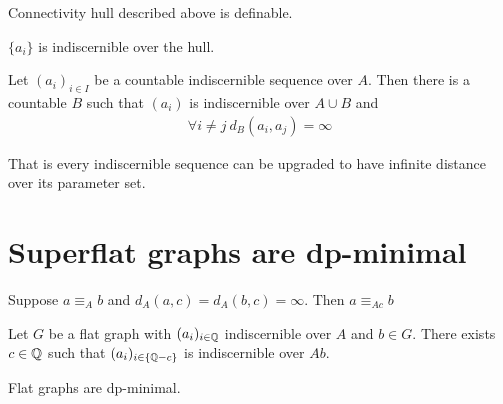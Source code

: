 \documentclass{amsart}
\begin{document}
\begin{Lemma}
	Connectivity hull described above is definable.
\end{Lemma}

\begin{Lemma}
	$\{a_i\}$ is indiscernible over the hull.
\end{Lemma}

\begin{Corollary}
	Let $(a_i)_{i \in I}$ be a countable indiscernible sequence over $A$. Then there is a countable $B$ such that  $(a_i)$ is indiscernible over $A \cup B$ and
	\begin{align*}
		\forall i \neq j \ d_B(a_i, a_j) = \infty
	\end{align*}
\end{Corollary}

That is every indiscernible sequence can be upgraded to have infinite distance over its parameter set.

\section{Superflat graphs are dp-minimal}

\begin{Lemma}
	Suppose $a \equiv_A b$ and $d_A(a, c) = d_A(b, c) = \infty$. Then $a \equiv_{Ac} b$
\end{Lemma}

\begin{Theorem}
	Let $G$ be a flat graph with $(a_i)_{i\in\mathbb{Q}}$ indiscernible over $A$ and $b \in G$. There exists $c \in \mathbb{Q}$ such that $(a_i)_{i\in\{\mathbb{Q} - c\}}$ is indiscernible over $Ab$.
\end{Theorem}

\begin{Corollary}
	Flat graphs are dp-minimal.
\end{Corollary}
\end{document}

